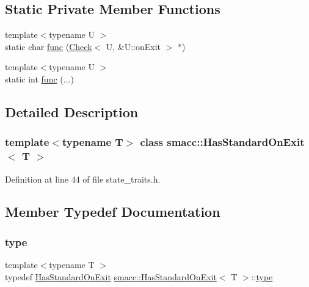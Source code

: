 \subsection*{Static Private Member Functions}
\begin{DoxyCompactItemize}
\item 
{\footnotesize template$<$typename U $>$ }\\static char \hyperlink{classsmacc_1_1HasStandardOnExit_ac0244e38b6233bdd304fe885c7a12e9f}{func} (\hyperlink{structsmacc_1_1HasStandardOnExit_1_1Check}{Check}$<$ U, \&U\+::on\+Exit $>$ $\ast$)
\item 
{\footnotesize template$<$typename U $>$ }\\static int \hyperlink{classsmacc_1_1HasStandardOnExit_a36115df0cabb66bfa5c7d4f08a8222eb}{func} (...)
\end{DoxyCompactItemize}


\subsection{Detailed Description}
\subsubsection*{template$<$typename T$>$\newline
class smacc\+::\+Has\+Standard\+On\+Exit$<$ T $>$}



Definition at line 44 of file state\+\_\+traits.\+h.



\subsection{Member Typedef Documentation}
\mbox{\label{classsmacc_1_1HasStandardOnExit_ab4466cdb73e2823f9395cc476f85068c}} 
\subsubsection{\texorpdfstring{type}{type}}
{\footnotesize\ttfamily template$<$typename T $>$ \\
typedef \hyperlink{classsmacc_1_1HasStandardOnExit}{Has\+Standard\+On\+Exit} \hyperlink{classsmacc_1_1HasStandardOnExit}{smacc\+::\+Has\+Standard\+On\+Exit}$<$ T $>$\+::\hyperlink{classsmacc_1_1HasStandardOnExit_ab4466cdb73e2823f9395cc476f85068c}{type}}



